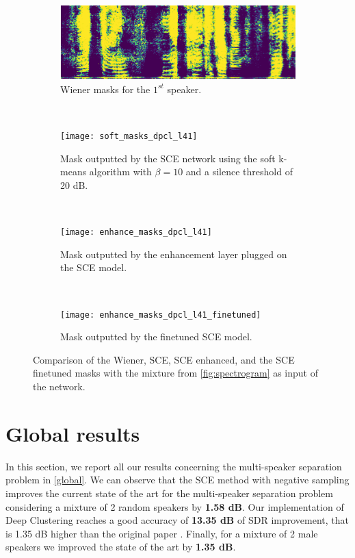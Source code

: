 \documentclass[master, tikz, final,11pt, dvipdfmx]{iscs-thesis}
\begin{document}
\begin{figure}[h!]
\centering
\begin{subfigure}[b]{0.8\textwidth}
\includegraphics[width=\textwidth]{wf2}
\caption{Wiener masks for the $1^{st}$ speaker.}
\label{fig:wfdpsce} 
\end{subfigure}
\\\begin{subfigure}[b]{0.8\textwidth}
\texttt{[image: soft\_masks\_dpcl\_l41]}
\captionsetup{justification=centering}
\caption{Mask outputted by the SCE network using the soft k-means algorithm with $\beta=10$ and a silence threshold of 20 dB.}
\label{fig:scemask} 
\end{subfigure}
\\
\begin{subfigure}[b]{0.8\textwidth}
\texttt{[image: enhance\_masks\_dpcl\_l41]}
\captionsetup{justification=centering}
\caption{Mask outputted by the enhancement layer plugged on the SCE model.}
\label{fig:scemaskenhanced} 
\end{subfigure}
\\
\begin{subfigure}[b]{0.8\textwidth}
\texttt{[image: enhance\_masks\_dpcl\_l41\_finetuned]}
\captionsetup{justification=centering}
\caption{Mask outputted by the finetuned SCE model.}
\label{fig:scemaskenhanced} 
\end{subfigure}
\caption[Comparison of the Wiener, SCE, SCE enhanced, and the SCE finetuned masks]{Comparison of the Wiener, SCE, SCE enhanced, and the SCE finetuned masks with the mixture from \autoref{fig:spectrogram} as input of the network.}
\label{fig:masksce} 
\end{figure}


\section{Global results}
\label{res:glo}
In this section, we report all our results concerning the multi-speaker separation problem in \autoref{global}.
We can observe that the SCE method with negative sampling improves the current state of the art for the multi-speaker separation problem considering a mixture of 2 random speakers by \textbf{1.58 dB}. Our implementation of Deep Clustering reaches a good accuracy of\textbf{ 13.35 dB} of SDR improvement, that is 1.35 dB higher than the original paper \cite{DPCLV2}. Finally, for a mixture of 2 male speakers we improved the state of the art by \textbf{1.35 dB}.
\end{document}
